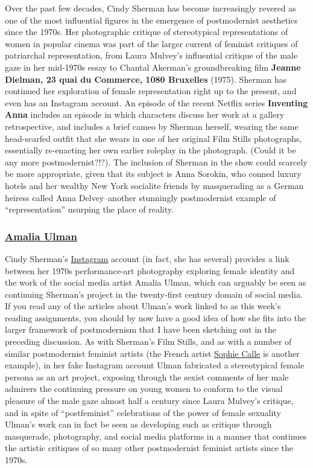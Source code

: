 \documentclass[
  letterpaper,
  DIV=11,
  numbers=noendperiod,
  oneside]{scrartcl}
\begin{document}
Over the past few decades, Cindy Sherman has become increasingly revered
as one of the most influential figures in the emergence of postmodernist
aesthetics since the 1970s. Her photographic critique of stereotypical
representations of women in popular cinema was part of the larger
current of feminist critiques of patriarchal representation, from Laura
Mulvey's influential critique of the male gaze in her mid-1970s essay to
Chantal Akerman's groundbreaking film \textbf{Jeanne Dielman, 23 quai du
Commerce, 1080 Bruxelles} (1975). Sherman has continued her exploration
of female representation right up to the present, and even has an
Instagram account. An episode of the recent Netflix series
\textbf{Inventing Anna} includes an episode in which characters discuss
her work at a gallery retrospective, and includes a brief cameo by
Sherman herself, wearing the same head-scarfed outfit that she wears in
one of her original Film Stills photographs, essentially re-enacting her
own earlier roleplay in the photograph. (Could it be any more
postmodernist?!?). The inclusion of Sherman in the show could scarcely
be more appropriate, given that its subject is Anna Sorokin, who conned
luxury hotels and her wealthy New York socialite friends by masquerading
as a German heiress called Anna Delvey--another stunningly postmodernist
example of ``representation'' usurping the place of reality.

\subsubsection{\texorpdfstring{\href{http://amaliaulman.eu/}{Amalia
Ulman}}{Amalia Ulman}}\label{amalia-ulman}

Cindy Sherman's
\href{https://www.instagram.com/cindyshermancomplete/}{Instagram}
account (in fact, she has several) provides a link between her 1970s
performance-art photography exploring female identity and the work of
the social media artist Amalia Ulman, which can arguably be seen as
continuing Sherman's project in the twenty-first century domain of
social media. If you read any of the articles about Ulman's work linked
to as this week's reading assignments, you should by now have a good
idea of how she fits into the larger framework of postmodernism that I
have been sketching out in the preceding discussion. As with Sherman's
Film Stills, and as with a number of similar postmodernist feminist
artists (the French artist
\href{https://www.newyorker.com/books/under-review/sophie-calle-and-the-art-of-leaving-a-trace}{Sophie
Calle} is another example), in her fake Instagram account Ulman
fabricated a stereotypical female persona as an art project, exposing
through the sexist comments of her male admirers the continuing pressure
on young women to conform to the visual pleasure of the male gaze almost
half a century since Laura Mulvey's critique, and in spite of
``postfeminist'' celebrations of the power of female sexuality Ulman's
work can in fact be seen as developing such as critique through
masquerade, photography, and social media platforms in a manner that
continues the artistic critiques of so many other postmodernist feminist
artists since the 1970s.
\end{document}
